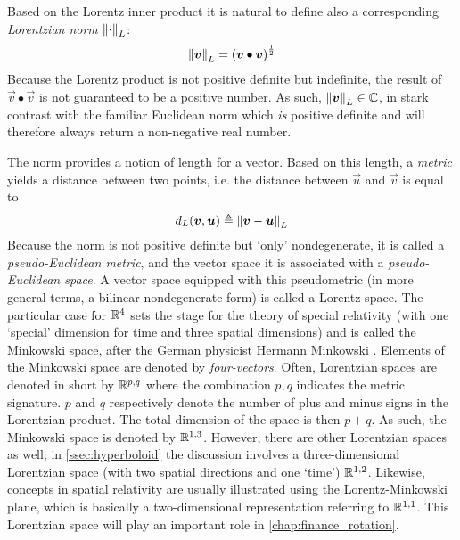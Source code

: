 Based on the Lorentz inner product it is natural to define also a corresponding \emph{Lorentzian norm} \(\norm{\cdot}_L\):
    \[
     \norm{\vb*{v}}_L = \qty(\vb*{v}\bullet\vb*{v})^\frac{1}{2}
\]
Because the Lorentz product is not positive definite but indefinite, the result of \(\vec{v}\bullet\vec{v}\) is not guaranteed to be a positive number. As such, \(\norm{\vb*{v}}_L \in \mathbb{C}\), in stark contrast with the familiar Euclidean norm which \emph{is} positive definite and will therefore always return a non-negative real number.

The norm provides a notion of length for a vector. Based on this length, a \emph{metric} yields a distance between two points, i.e. the distance between \(\vec{u}\) and \(\vec{v}\) is equal to 
\[
     d_L(\vb*{v}, \vb*{u}) \triangleq \norm{\vb*{v} - \vb*{u}}_L
\] 
Because the norm is not positive definite but `only' nondegenerate, it is called a \emph{pseudo-Euclidean metric}, and the vector space it is associated with a \emph{pseudo-Euclidean space}. A vector space equipped with this pseudometric (in more general terms, a bilinear nondegenerate form) is called a Lorentz space. The particular case for \(\mathbb{R}^4\) sets the stage for the theory of special relativity (with one `special' dimension for time and three spatial dimensions) and is called the Minkowski space, after the German physicist Hermann Minkowski \cite{Catoni2008}. Elements of the Minkowski space are denoted by \emph{four-vectors}. Often, Lorentzian spaces are denoted in short by $\mathbb{R}^{p,q}$ where the combination $p,q$ indicates the metric signature. $p$ and $q$ respectively denote the number of plus and minus signs in the Lorentzian product. The total dimension of the space is then $p + q$. As such, the Minkowski space is denoted by $\mathbb{R}^{1,3}$. However, there are other Lorentzian spaces as well; in \cref{ssec:hyperboloid} the discussion involves a three-dimensional Lorentzian space (with two spatial directions and one `time') $\mathbb{R}^{1,2}$. Likewise, concepts in spatial relativity are usually illustrated using the Lorentz-Minkowski plane, which is basically a two-dimensional representation referring to $\mathbb{R}^{1,1}$. This Lorentzian space will play an important role in \cref{chap:finance_rotation}.

